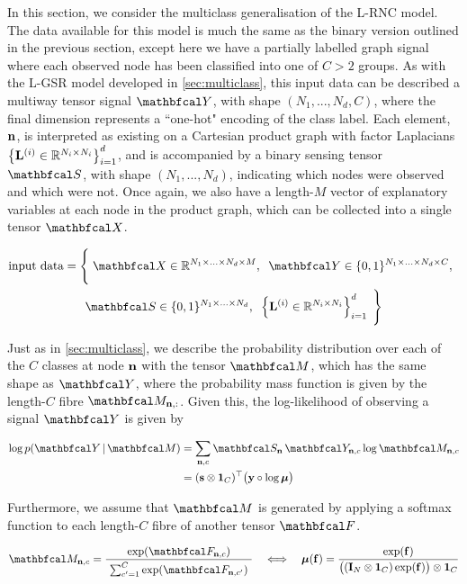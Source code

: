 In this section, we consider the multiclass generalisation of the L-RNC model. The data available for this model is much the same as the binary version outlined in the previous section, except here we have a partially labelled graph signal where each observed node has been classified into one of $C > 2$ groups. As with the L-GSR model developed in \cref{sec:multiclass}, this input data can be described a multiway tensor signal $\Yt$, with shape $(N_1, ..., N_d, C)$, where the final dimension represents a ``one-hot"  encoding of the class label. Each element, $\mathbf{n}$, is interpreted as existing on a Cartesian product graph with factor Laplacians $\left\{\mathbf{L}^{(i)} \in \mathbb{R}^{N_i \times N_i}\right\}_{i=1}^d$, and is accompanied by a binary sensing tensor $\St$, with shape $(N_1, ..., N_d)$, indicating which nodes were observed and which were not. Once again, we also have a length-$M$ vector of explanatory variables at each node in the product graph, which can be collected into a single tensor $\Xt$. 

\begin{multline*}
    \text{input data} = \Bigg\{\;\Xt \in \R^{N_1 \times ... \times N_d \times M}, \;\; \Yt \in \{0, 1\}^{N_1 \times ... \times N_d \times C}, \;\; \\ 
    \St \in \{0, 1\}^{N_1 \times ... \times N_d} , \;\; \left\{\LL^{(i)} \in \R^{N_i \times N_i}\right\}_{i=1}^d \; \Bigg\}
\end{multline*}

Just as in \cref{sec:multiclass}, we describe the probability distribution over each of the $C$ classes at node $\mathbf{n}$ with the tensor $\Mt$, which has the same shape as $\Yt$, where the probability mass function is given by the length-$C$ fibre $\Mt_{\nn, :}$. Given this, the log-likelihood of observing a signal $\Yt$ is given by 

\begin{align}
   \log p(\Yt \, | \, \Mt) &= \sum_{\nn, c} \St_{\nn} \, \Yt_{\nn, c} \log \Mt_{\nn, c} \notag \\
   &= (\s \otimes \one_C)^\top \big(\y \circ \log \muu \big)
\end{align}

Furthermore, we assume that $\Mt$ is generated by applying a softmax function to each length-$C$ fibre of another tensor $\Ft$. 

\begin{equation}
    \Mt_{\nn, c} = \frac{\exp(\Ft_{\nn, c})}{ \raisebox{-0.1cm} { $\sum_{c'=1}^C \exp(\Ft_{\nn, c'})$ }}  \quad \Longleftrightarrow \quad \muu(\f) = \frac{\exp(\f)}{ \big((\I_N \otimes \one_C) \exp(\f)\big) \otimes \one_C}
\end{equation}



